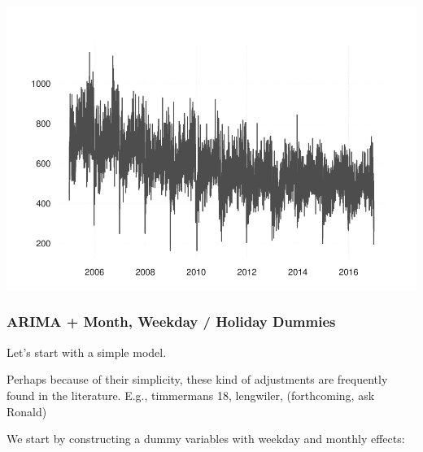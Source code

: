 \documentclass[
]{article}
\newenvironment{Shaded}{\begin{snugshade}}{\end{snugshade}}
\newcommand{\DataTypeTok}[1]{\textcolor[rgb]{0.13,0.29,0.53}{#1}}
\newcommand{\KeywordTok}[1]{\textcolor[rgb]{0.13,0.29,0.53}{\textbf{#1}}}
\newcommand{\NormalTok}[1]{#1}
\newcommand{\OperatorTok}[1]{\textcolor[rgb]{0.81,0.36,0.00}{\textbf{#1}}}
\newcommand{\OtherTok}[1]{\textcolor[rgb]{0.56,0.35,0.01}{#1}}
\newcommand{\StringTok}[1]{\textcolor[rgb]{0.31,0.60,0.02}{#1}}
\begin{document}
\includegraphics{overview_files/figure-latex/unnamed-chunk-1-1.pdf}

\hypertarget{arima-month-weekday-holiday-dummies}{%
\subsubsection{ARIMA + Month, Weekday / Holiday
Dummies}\label{arima-month-weekday-holiday-dummies}}

Let's start with a simple model.

Perhaps because of their simplicity, these kind of adjustments are
frequently found in the literature. E.g., timmermans 18, lengwiler,
(forthcoming, ask Ronald)

We start by constructing a dummy variables with weekday and monthly
effects:

\begin{Shaded}
\end{Shaded}
\end{document}
